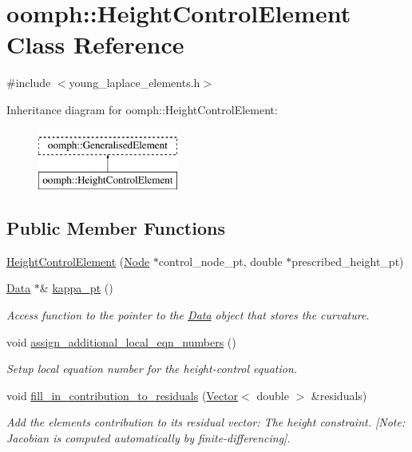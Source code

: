 \hypertarget{classoomph_1_1HeightControlElement}{}\section{oomph\+:\+:Height\+Control\+Element Class Reference}
\label{classoomph_1_1HeightControlElement}


{\ttfamily \#include $<$young\+\_\+laplace\+\_\+elements.\+h$>$}

Inheritance diagram for oomph\+:\+:Height\+Control\+Element\+:\begin{figure}[H]
\begin{center}
\leavevmode
\includegraphics[height=2.000000cm]{classoomph_1_1HeightControlElement}
\end{center}
\end{figure}
\subsection*{Public Member Functions}
\begin{DoxyCompactItemize}
\item 
\hyperlink{classoomph_1_1HeightControlElement_abb74c76bc5615a50794d1d26711f1203}{Height\+Control\+Element} (\hyperlink{classoomph_1_1Node}{Node} $\ast$control\+\_\+node\+\_\+pt, double $\ast$prescribed\+\_\+height\+\_\+pt)
\item 
\hyperlink{classoomph_1_1Data}{Data} $\ast$\& \hyperlink{classoomph_1_1HeightControlElement_ac99cf23c634731656b17c18ece472b85}{kappa\+\_\+pt} ()
\begin{DoxyCompactList}\small\item\em Access function to the pointer to the \hyperlink{classoomph_1_1Data}{Data} object that stores the curvature. \end{DoxyCompactList}\item 
void \hyperlink{classoomph_1_1HeightControlElement_a1d14c779f9ca1dcf26864406d6d32adb}{assign\+\_\+additional\+\_\+local\+\_\+eqn\+\_\+numbers} ()
\begin{DoxyCompactList}\small\item\em Setup local equation number for the height-\/control equation. \end{DoxyCompactList}\item 
void \hyperlink{classoomph_1_1HeightControlElement_a4b60627344a4a3d6647aabc994059d9d}{fill\+\_\+in\+\_\+contribution\+\_\+to\+\_\+residuals} (\hyperlink{classoomph_1_1Vector}{Vector}$<$ double $>$ \&residuals)
\begin{DoxyCompactList}\small\item\em Add the element\textquotesingle{}s contribution to its residual vector\+: The height constraint. \mbox{[}Note\+: Jacobian is computed automatically by finite-\/differencing\mbox{]}. \end{DoxyCompactList}\end{DoxyCompactItemize}
